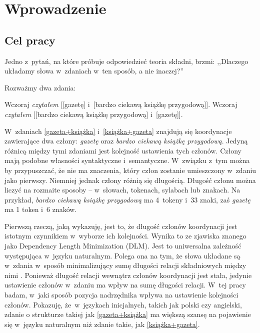 \chapter{Wprowadzenie} \label{ch1}
\section{Cel pracy}

Jedno z~pytań, na które próbuje odpowiedzieć teoria składni, brzmi: ,,Dlaczego układamy słowa w~zdaniach w~ten sposób, a nie inaczej?''

Rozważmy dwa zdania:

\begin{exe}
\ex \label{gazeta+książka} Wczoraj \emph{czytałem} [[gazetę] i~[bardzo ciekawą książkę przygodową]].
\ex \label{książka+gazeta} Wczoraj \emph{czytałem} [[bardzo ciekawą książkę przygodową] i~[gazetę]].
\end{exe}

W~zdaniach \eqref{gazeta+książka} i~\eqref{książka+gazeta} znajdują się koordynacje zawierające dwa człony: \emph{gazetę} oraz \emph{bardzo ciekawą książkę przygodową}. Jedyną różnicą między tymi zdaniami jest kolejność ustawienia tych członów. Człony mają podobne własności syntaktyczne i~semantyczne. W~związku z~tym można by przypuszczać, że nie ma znaczenia, który człon zostanie umieszczony w~zdaniu jako pierwszy. Niemniej jednak człony różnią się długością. Długość członu można liczyć na rozmaite sposoby -- w~słowach, tokenach, sylabach lub znakach. Na przykład, \emph{bardzo ciekawą książkę przygodową} ma 4~tokeny i~33 znaki, zaś \emph{gazetę} ma 1 token i~6 znaków. 

Pierwszą rzeczą, jaką wykazuję, jest to, że długość członów koordynacji jest istotnym czynnikiem w~wyborze ich kolejności. Wynika to ze zjawiska znanego jako Dependency Length Minimization (DLM). Jest to uniwersalna zależność występująca w~języku naturalnym. Polega ona na tym, że słowa układane są w~zdania w~sposób minimalizujący sumę długości relacji składniowych między nimi \citep{temperley2007minimization, futrell2015large}. Ponieważ długość relacji wewnątrz członów koordynacji jest stała, jedynie ustawienie członów w~zdaniu ma wpływ na sumę długości relacji. 
W~tej pracy badam, w~jaki sposób pozycja nadrzędnika wpływa na ustawienie kolejności członów. Pokazuję, że~w~językach inicjalnych, takich jak polski czy angielski, zdanie o strukturze takiej jak \eqref{gazeta+książka} ma większą szansę na pojawienie się w~języku naturalnym niż zdanie takie, jak \eqref{książka+gazeta}.

